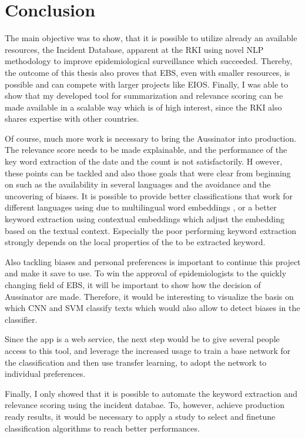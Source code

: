 \chapter{Conclusion}
The main objective was to show, that it is possible to utilize already an available resources, the Incident Database, apparent at the RKI using novel NLP methodology to improve epidemiological surveillance which succeeded. Thereby, the outcome of this thesis also proves that EBS, even with smaller resources, is possible and can compete with larger projects like EIOS. Finally, I was able to show that my developed tool for summarization and relevance scoring can be made available in a scalable way which is of high interest, since the RKI also shares expertise with other countries.

Of course, much more work is necessary to bring the Aussinator into production. The relevance score needs to be made explainable, and the performance of the key word extraction of the date and the count is not satisfactorily.
H
owever, these points can be tackled and also those goals that were clear from beginning on such as the availability in several languages and the avoidance and the uncovering of biases.
It is possible to provide better classifications that work for different languages using due to multilingual word embeddings \citep{Chen2018}, or a better keyword extraction using contextual embeddings \citep{Devlin2018, Peters2018} which adjust the embedding based on the textual context. Especially the poor performing keyword extraction strongly depends on the local properties of the to be extracted keyword.

Also tackling biases and personal preferences is important to continue this project and make it save to use.
To win the approval of epidemiologists to the quickly changing field of EBS, it will be important to show how the decision of Aussinator are made. Therefore, it would be interesting to visualize the basis on which CNN and SVM classify texts which would also allow to detect biases in the classifier.

Since the app is a web service, the next step would be to give several people access to this tool, and leverage the increased usage to train a base network for the classification and then use transfer learning, to adopt the network to individual preferences.

Finally, I only showed that it is possible to automate the keyword extraction and relevance scoring using the incident databae. To, however, achieve production ready results, it would be necessary to apply a study to select and finetune classification algorithms to reach better performances.
